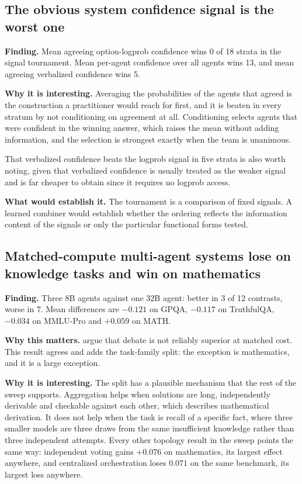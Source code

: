 \subsection{The obvious system confidence signal is the worst one}

\textbf{Finding.} Mean agreeing option-logprob confidence wins 0 of 18 strata in the signal
tournament. Mean per-agent confidence over all agents wins 13, and mean agreeing verbalized
confidence wins 5.

\textbf{Why it is interesting.} Averaging the probabilities of the agents that agreed is the
construction a practitioner would reach for first, and it is beaten in every stratum by not
conditioning on agreement at all. Conditioning selects agents that were confident in the
winning answer, which raises the mean without adding information, and the selection is
strongest exactly when the team is unanimous.

That verbalized confidence beats the logprob signal in five strata is also worth noting,
given that verbalized confidence is usually treated as the weaker signal and is far cheaper
to obtain since it requires no logprob access.

\textbf{What would establish it.} The tournament is a comparison of fixed signals. A learned
combiner would establish whether the ordering reflects the information content of the
signals or only the particular functional forms tested.

\subsection{Matched-compute multi-agent systems lose on knowledge tasks and win on mathematics}

\textbf{Finding.} Three 8B agents against one 32B agent: better in 3 of 12 contrasts, worse
in 7. Mean differences are $-0.121$ on GPQA, $-0.117$ on TruthfulQA, $-0.034$ on MMLU-Pro
and $+0.059$ on MATH.

\textbf{Why this matters.} \citet{smit2024debate} argue that debate is not reliably superior
at matched cost. This result agrees and adds the task-family split: the exception is
mathematics, and it is a large exception.

\textbf{Why it is interesting.} The split has a plausible mechanism that the rest of the
sweep supports. Aggregation helps when solutions are long, independently derivable and
checkable against each other, which describes mathematical derivation. It does not help when
the task is recall of a specific fact, where three smaller models are three draws from the
same insufficient knowledge rather than three independent attempts. Every other topology
result in the sweep points the same way: independent voting gains $+0.076$ on mathematics,
its largest effect anywhere, and centralized orchestration loses $0.071$ on the same
benchmark, its largest loss anywhere.

